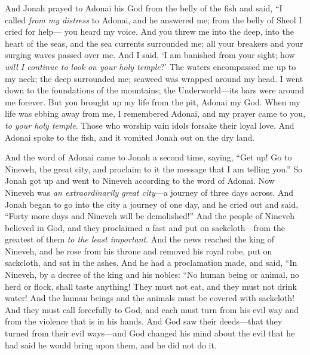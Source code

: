 \begin{biblechapter} %
\verse And Jonah prayed to Adonai his God from the belly of the fish
\verse and said,
\verse “I called \textit{from my distress} to Adonai, 
and he answered me; 
from the belly of Sheol I cried for help— 
you heard my voice.
\verse And you threw me into the deep, 
into the heart of the seas, 
and the sea currents surrounded me; 
all your breakers and your surging waves 
passed over me.
\verse And I said, ‘I am banished 
from your sight; 
how \textit{will I continue to look} 
\textit{on your holy temple}?’
\verse The waters encompassed me up to my neck; 
the deep surrounded me; 
seaweed was wrapped around my head.
\verse I went down to the foundations of the mountains; 
the Underworld—its bars were around me forever. 
But you brought up my life from the pit, 
Adonai my God.
\verse When my life was ebbing away from me, 
I remembered Adonai, 
and my prayer came to you, 
\textit{to your holy temple}.
\verse Those who worship vain idols 
forsake their loyal love.
\verse And Adonai spoke to the fish, and it vomited Jonah out on the dry land.
\end{biblechapter}

\begin{biblechapter} %
 And the word of Adonai came to Jonah a second time, saying,
\verse “Get up! Go to Nineveh, the great city, and proclaim to it the message that I am telling you.”
\verse So Jonah got up and went to Nineveh according to the word of Adonai. Now Nineveh was \textit{an extraordinarily great city}—a journey of three days across.
\verse And Jonah began to go into the city a journey of one day, and he cried out and said, “Forty more days and Nineveh will be demolished!”
\verse And the people of Nineveh believed in God, and they proclaimed a fast and put on sackcloth—from the greatest of them \textit{to the least important}.
 And the news reached the king of Nineveh, and he rose from his throne and removed his royal robe, put on sackcloth, and sat in the ashes.
\verse And he had a proclamation made, and said, “In Nineveh, by a decree of the king and his nobles:
\verse “No human being or animal, no herd or flock, shall taste anything! They must not eat, and they must not drink water!
\verse And the human beings and the animals must be covered with sackcloth! And they must call forcefully to God, and each must turn from his evil way and from the violence that is in his hands.
\verse And God saw their deeds—that they turned from their evil ways—and God changed his mind about the evil that he had said he would bring upon them, and he did not do it.
\end{biblechapter}


